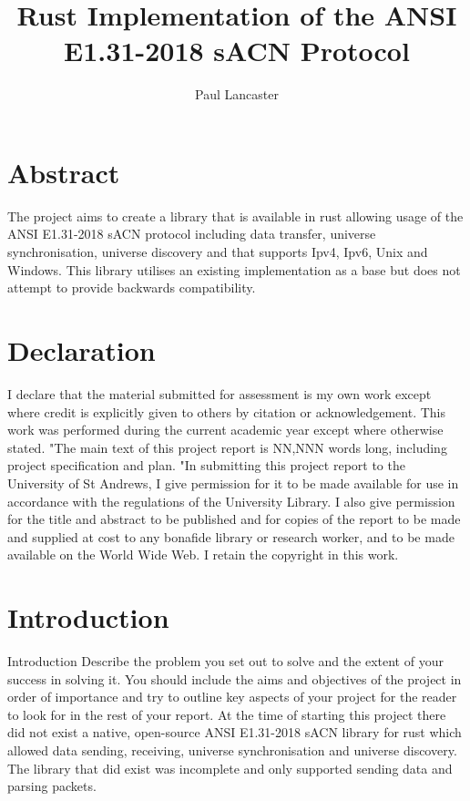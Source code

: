 \documentclass[11pt,a4paper]{report}
\author{Paul Lancaster}
\title{Rust Implementation of the ANSI E1.31-2018 sACN Protocol}
\begin{document}
	
	
	\section{Abstract}
	The project aims to create a library that is available in rust allowing usage of the ANSI E1.31-2018 sACN \cite{ANSI_E1.31} protocol including data transfer, universe synchronisation, universe discovery and that supports Ipv4, Ipv6, Unix and Windows. This library utilises an existing implementation \cite{ORIGINAL_IMPL} as a base but does not attempt to provide backwards compatibility.
	
	\section{Declaration}
	I declare that the material submitted for
	assessment is my own work except where credit is
	explicitly given to others by citation or
	acknowledgement. This work was performed during
	the current academic year except where otherwise
	stated.
	"The main text of this project report is NN,NNN
	words long, including project specification and plan.
	"In submitting this project report to the University of
	St Andrews, I give permission for it to be made
	available for use in accordance with the regulations of the University Library. I also give permission for
	the title and abstract to be published and for copies of the report to be made and supplied at cost to any bonafide library or research worker, and to be made
	available on the World Wide Web. I retain the
	copyright in this work.
	
	
	\tableofcontents
	\pagebreak
	
\section{Introduction}
		Introduction
		Describe the problem you set out to solve and the
		extent of your success in solving it. You should include
		the aims and objectives of the project in order of
		importance and try to outline key aspects of your
		project for the reader to look for in the rest of your
		report.
	At the time of starting this project there did not exist a native, open-source ANSI E1.31-2018 sACN library for rust which allowed data sending, receiving, universe synchronisation and universe discovery.  The library that did exist was incomplete and only supported sending data and parsing packets.\\
	
\end{document}

